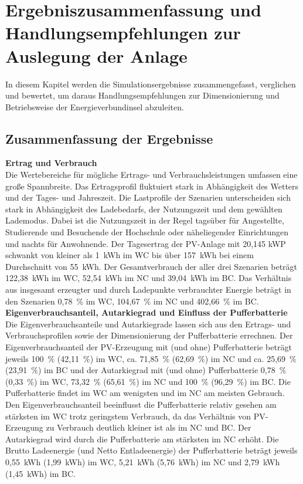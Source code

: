 \chapter{Ergebniszusammenfassung und Handlungsempfehlungen zur Auslegung der Anlage}
\label{Kap5}
In diesem Kapitel werden die Simulationsergebnisse zusammengefasst, verglichen und bewertet, um daraus Handlungsempfehlungen zur Dimensionierung und Betriebsweise der Energieverbundinsel abzuleiten.

\section{Zusammenfassung der Ergebnisse}
\label{Kap:Simulation_result}
	\textbf{Ertrag und Verbrauch}\\
	Die Wertebereiche für mögliche Ertrags- und Verbrauchsleistungen umfassen eine große Spannbreite. Das Ertragsprofil fluktuiert stark in Abhängigkeit des Wetters und der Tages- und Jahreszeit. Die Lastprofile der Szenarien unterscheiden sich stark in Abhängigkeit des Ladebedarfs, der Nutzungszeit und dem gewählten Lademodus. Dabei ist die Nutzungszeit in der Regel tagsüber für Angestellte, Studierende und Besuchende der Hochschule oder näheliegender Einrichtungen und nachts für Anwohnende. Der Tagesertrag der PV-Anlage mit 20,145 kWP schwankt von kleiner als 1~kWh im WC bis über 157~kWh bei einem Durchschnitt von 55~kWh. Der Gesamtverbrauch der aller drei Szenarien beträgt 122,38~kWh im WC, 52,54~kWh im NC und 39,04~kWh im BC. Das Verhältnis aus insgesamt erzeugter und durch Ladepunkte verbrauchter Energie beträgt in den Szenarien 0,78~$\%$ im WC, 104,67~$\%$ im NC und 402,66~$\%$ im BC.\\

	\textbf{Eigenverbrauchsanteil, Autarkiegrad und Einfluss der Pufferbatterie}\\
	Die Eigenverbrauchsanteile und Autarkiegrade lassen sich aus den Ertrags- und Verbrauchsprofilen sowie der Dimensionierung der Pufferbatterie errechnen. Der Eigenverbrauchsanteil der PV-Erzeugung mit (und ohne) Pufferbatterie beträgt jeweils 100~$\%$ (42,11~$\%$) im WC, ca. 71,85~$\%$ (62,69~$\%$) im NC und ca. 25,69~$\%$ (23,91~$\%$) im BC und der Autarkiegrad mit (und ohne) Pufferbatterie
0,78~$\%$ (0,33~$\%$) im WC, 73,32~$\%$ (65,61~$\%$) im NC und 100~$\%$ (96,29~$\%$) im BC. Die Pufferbatterie findet im WC am wenigsten und im NC am meisten Gebrauch. Den Eigenverbrauchsanteil beeinflusst die Pufferbatterie relativ gesehen am stärksten im WC trotz geringstem Verbrauch, da das Verhältnis von PV-Erzeugung zu Verbrauch deutlich kleiner ist als im NC und BC. Der Autarkiegrad wird durch die Pufferbatterie am stärksten im NC erhöht. Die Brutto Ladeenergie (und Netto Entladeenergie) der Pufferbatterie beträgt jeweils 0,55~kWh (1,99~kWh) im WC, 5,21~kWh (5,76~kWh) im NC und 2,79~kWh (1,45~kWh) im BC.\\

